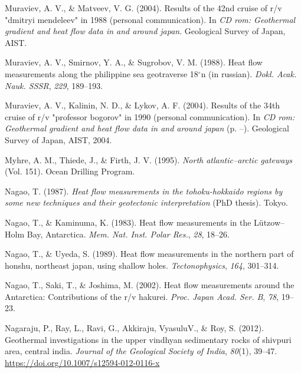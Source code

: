 \documentclass[draft,linenumbers]{agujournal2018}
\begin{document}
\leavevmode{}%
Muraviev, A. V., \& Matveev, V. G. (2004). Results of the 42nd cruise of
r/v "dmitryi mendeleev" in 1988 (personal communication). In \emph{CD
rom: Geothermal gradient and heat flow data in and around japan}.
Geological Survey of Japan, AIST.

\leavevmode{}%
Muraviev, A. V., Smirnov, Y. A., \& Sugrobov, V. M. (1988). Heat flow
measurements along the philippine sea geotraverse 18{\(^\circ\)}n (in
russian). \emph{Dokl. Acak. Nauk. SSSR}, \emph{229}, 189--193.

\leavevmode{}%
Muraviev, A. V., Kalinin, N. D., \& Lykov, A. F. (2004). Results of the
34th cruise of r/v "professor bogorov" in 1990 (personal communication).
In \emph{CD rom: Geothermal gradient and heat flow data in and around
japan} (p. --). Geological Survey of Japan, AIST, 2004.

\leavevmode{}%
Myhre, A. M., Thiede, J., \& Firth, J. V. (1995). \emph{North
atlantic--arctic gateways} (Vol. 151). Ocean Drilling Program.

\leavevmode{}%
Nagao, T. (1987). \emph{Heat flow measurements in the tohoku-hokkaido
regions by some new techniques and their geotectonic interpretation}
(PhD thesis). Tokyo.

\leavevmode{}%
Nagao, T., \& Kaminuma, K. (1983). Heat flow measurements in the
{Lützow--Holm Bay, Antarctica}. \emph{Mem. Nat. Inst. Polar Res.},
\emph{28}, 18--26.

\leavevmode{}%
Nagao, T., \& Uyeda, S. (1989). Heat flow measurements in the northern
part of honshu, northeast japan, using shallow holes.
\emph{Tectonophysics}, \emph{164}, 301--314.

\leavevmode{}%
Nagao, T., Saki, T., \& Joshima, M. (2002). Heat flow measurements
around the {Antarctica}: Contributions of the r/v hakurei. \emph{Proc.
Japan Acad. Ser. B}, \emph{78}, 19--23.

\leavevmode{}%
Nagaraju, P., Ray, L., Ravi, G., Akkiraju, VyasuluV., \& Roy, S. (2012).
Geothermal investigations in the upper vindhyan sedimentary rocks of
shivpuri area, central india. \emph{Journal of the Geological Society of
India}, \emph{80}(1), 39--47.
\url{https://doi.org/10.1007/s12594-012-0116-x}
\end{document}
